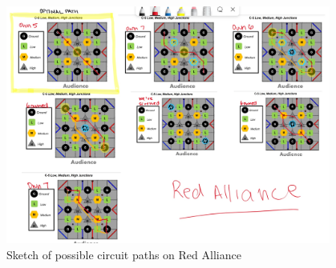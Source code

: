 \begin{figure}[htp]
\centering
\includegraphics[width=0.95\textwidth, angle=0]{Meetings/September/09-10-22/09-10-22-Paths.jpg}
\caption{Sketch of possible circuit paths on Red Alliance}
\label{fig:pic3}
\end{figure}

